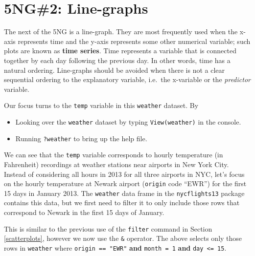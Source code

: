 \documentclass[]{tufte-book}
\newenvironment{Shaded}{\begin{snugshade}}{\end{snugshade}}
\newcommand{\KeywordTok}[1]{\textcolor[rgb]{0.13,0.29,0.53}{\textbf{{#1}}}}
\newcommand{\DecValTok}[1]{\textcolor[rgb]{0.00,0.00,0.81}{{#1}}}
\newcommand{\StringTok}[1]{\textcolor[rgb]{0.31,0.60,0.02}{{#1}}}
\newcommand{\NormalTok}[1]{{#1}}
\providecommand{\tightlist}{%
  \setlength{\itemsep}{0pt}\setlength{\parskip}{0pt}}
\begin{document}
\section{5NG\#2: Line-graphs}\label{linegraphs}

The next of the 5NG is a line-graph. They are most frequently used when
the x-axis represents time and the y-axis represents some other
numerical variable; such plots are known as \textbf{time series}. Time
represents a variable that is connected together by each day following
the previous day. In other words, time has a natural ordering.
Line-graphs should be avoided when there is not a clear sequential
ordering to the explanatory variable, i.e.~the x-variable or the
\emph{predictor} variable.

Our focus turns to the \texttt{temp} variable in this \texttt{weather}
dataset. By

\begin{itemize}
\tightlist
\item
  Looking over the \texttt{weather} dataset by typing
  \texttt{View(weather)} in the console.
\item
  Running \texttt{?weather} to bring up the help file.
\end{itemize}

We can see that the \texttt{temp} variable corresponds to hourly
temperature (in Fahrenheit) recordings at weather stations near airports
in New York City. Instead of considering all hours in 2013 for all three
airports in NYC, let's focus on the hourly temperature at Newark airport
(\texttt{origin} code ``EWR'') for the first 15 days in January 2013.
The \texttt{weather} data frame in the \texttt{nycflights13} package
contains this data, but we first need to filter it to only include those
rows that correspond to Newark in the first 15 days of January.

\begin{Shaded}
\end{Shaded}

This is similar to the previous use of the \texttt{filter} command in
Section \ref{scatterplots}, however we now use the \texttt{\&} operator.
The above selects only those rows in \texttt{weather} where
\texttt{origin\ ==\ "EWR"} \textbf{and} \texttt{month\ =\ 1}
\textbf{and} \texttt{day\ \textless{}=\ 15}.
\end{document}
